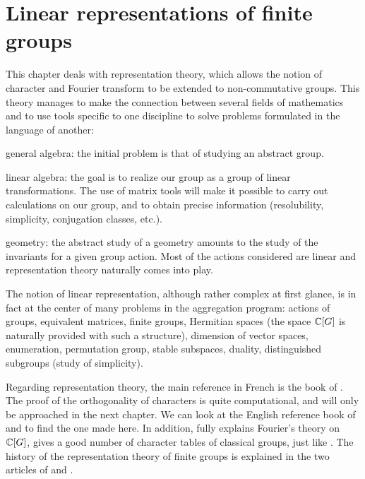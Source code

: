 
\chapter{Linear representations of finite groups}
\label{chap-linear-representations-finite-groups}
 
 
 
This chapter deals with representation theory, which allows the notion of character and Fourier transform to be extended to non-commutative groups. This theory manages to make the connection between several fields of mathematics and to use tools specific to one discipline to solve problems formulated in the language of another: \begin{rs}
\item general algebra: the initial problem is that of studying an abstract group.
\item {} linear algebra: the goal is to  realize our group as a group of linear transformations. The use of matrix tools will make it possible to carry out calculations on our group, and to obtain precise information (resolubility, simplicity, conjugation classes, etc.).
\item geometry: the abstract study of a geometry amounts to the study of the invariants for a given group action. Most of the actions considered are linear and representation theory naturally comes into play.
\end{rs}
 
 
The notion of linear representation, although rather complex at first glance, is in fact at the center of many problems in the aggregation program: actions of groups, equivalent matrices, finite groups, Hermitian spaces (the space $ \mathbb{C} [ G] $ is naturally provided with such a structure), dimension of vector spaces, enumeration, permutation group, stable subspaces, duality, distinguished subgroups (study of simplicity).
 
 
Regarding representation theory, the main reference in French is the book of  \cite{serre-representation}. The proof of the orthogonality of characters is quite computational, and will only be approached in the next chapter. We can look at the English reference book of  and  \cite{fulton} to find the one made here. In addition, \cite{goodman} fully explains Fourier's theory on $ \mathbb{C} [G] $, \cite{alperin} gives a good number of character tables of classical groups, just like \cite{collins}. The history of the representation theory of finite groups is explained in the two articles of  \cite{lam-representation-ams-part1} and \cite{lam-representation-ams-part2}.
